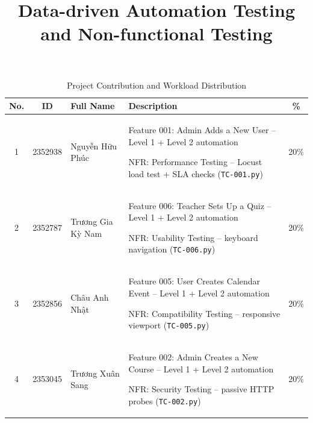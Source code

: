 \documentclass[twoside,final]{hcmut-report}
\title{Data-driven Automation Testing and Non-functional Testing}
\begin{document}
\coverpage%

\tableofcontents
\pagebreak

\begin{table}[ht]
    \centering
    \caption{Project Contribution and Workload Distribution}
    \vspace{0.2cm}
    \small
    \renewcommand{\arraystretch}{1.4}

    \begin{tabularx}{\textwidth}{|c|c|p{2.5cm}|>{\raggedright\arraybackslash}X|c|}
    \hline
    \textbf{No.} & \textbf{ID} & \textbf{Full Name} & \textbf{Description} & \textbf{\%} \\ \hline

    1 & 2352938 & Nguyễn Hữu Phúc &
    \begin{filelist}
        \item Feature 001: Admin Adds a New User -- Level 1 + Level 2 automation
        \item NFR: Performance Testing -- Locust load test + SLA checks (\texttt{TC-001.py})
    \end{filelist} & 20\% \\ \hline

    2 & 2352787 & Trương Gia Kỳ Nam &
    \begin{filelist}
       \item Feature 006: Teacher Sets Up a Quiz -- Level 1 + Level 2 automation
       \item NFR: Usability Testing -- keyboard navigation (\texttt{TC-006.py})
    \end{filelist} & 20\% \\ \hline

    3 & 2352856 & Châu Anh Nhật &
    \begin{filelist}
        \item Feature 005: User Creates Calendar Event -- Level 1 + Level 2 automation
        \item NFR: Compatibility Testing -- responsive viewport (\texttt{TC-005.py})
    \end{filelist} & 20\% \\ \hline

    4 & 2353045 & Trương Xuân Sang &
    \begin{filelist}
       \item Feature 002: Admin Creates a New Course -- Level 1 + Level 2 automation
       \item NFR: Security Testing -- passive HTTP probes (\texttt{TC-002.py})
    \end{filelist} & 20\% \\ \hline


\end{tabularx}
\end{table}
\end{document}
